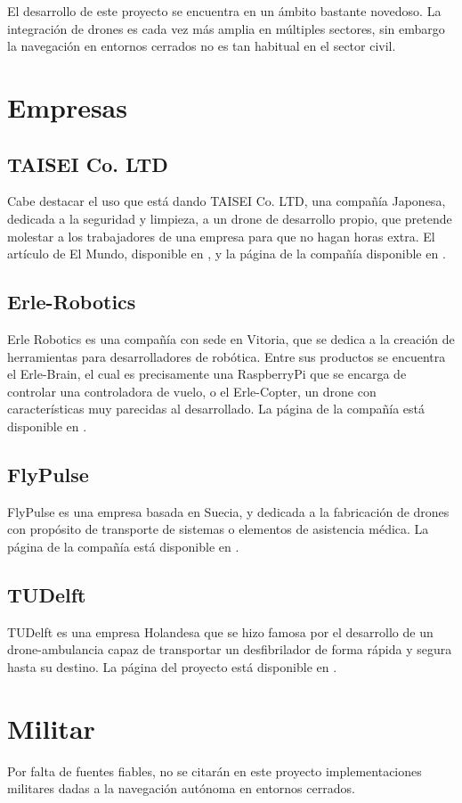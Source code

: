 
El desarrollo de este proyecto se encuentra en un ámbito bastante novedoso. La integración de drones es cada vez más amplia en múltiples sectores, sin embargo la navegación en entornos cerrados no es tan habitual en el sector civil. 



\section{Empresas}

\subsection{TAISEI Co. LTD}
Cabe destacar el uso que está dando TAISEI Co. LTD, una compañía Japonesa, dedicada a la seguridad y limpieza, a un drone de desarrollo propio, que pretende molestar a los trabajadores de una empresa para que no hagan horas extra.
El artículo de El Mundo, disponible en \citep{art:taisei}, y la página de la compañía disponible en \citep{wiki:taisei}.

\subsection{Erle-Robotics}
Erle Robotics es una compañía con sede en Vitoria, que se dedica a la creación de herramientas para desarrolladores de robótica. Entre sus productos se encuentra el Erle-Brain, el cual es precisamente una RaspberryPi que se encarga de controlar una controladora de vuelo, o el Erle-Copter, un drone con características muy parecidas al desarrollado. La página de la compañía está disponible en \citep{wiki:erle}.

\subsection{FlyPulse}
FlyPulse es una empresa basada en Suecia, y dedicada a la fabricación de drones con propósito de transporte de sistemas o elementos de asistencia médica. La página de la compañía está disponible en \citep{wiki:flypulse}.

\subsection{TUDelft} 
TUDelft es una empresa Holandesa que se hizo famosa por el desarrollo de un drone-ambulancia capaz de transportar un desfibrilador de forma rápida y segura hasta su destino. La página del proyecto está disponible en \citep{wiki:tudelft}.


\section{Militar}
Por falta de fuentes fiables, no se citarán en este proyecto implementaciones militares dadas a la navegación autónoma en entornos cerrados.
